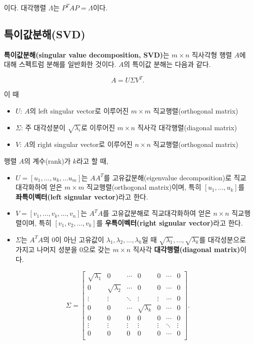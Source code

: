 \documentclass[b5paper,]{scrbook}
\theoremstyle{plain}
\theoremstyle{definition}
\numberwithin{equation}{section}
\begin{document}
이다. 대각행렬 \(\Lambda\)는 \(P^{T}AP=\Lambda\)이다.

\subsection{특이값분해(SVD)}\label{svd}

\textbf{특이값분해(singular value decomposition, SVD)}는 \(m\times n\)
직사각형 행렬 \(A\)에 대해 스펙트럼 분해를 일반화한 것이다. \(A\)의
특이값 분해는 다음과 같다.

\[A=U\Sigma V^{T}.\]

이 때

\begin{itemize}
\item
  \(U\): \(A\)의 left singular vector로 이루어진 \(m\times m\)
  직교행렬(orthogonal matrix)
\item
  \(\Sigma\): 주 대각성분이 \(\sqrt{\lambda_{i}}\)로 이루어진
  \(m\times n\) 직사각 대각행렬(diagonal matrix)
\item
  \(V\): \(A\)의 right singular vector로 이루어진 \(n\times n\)
  직교행렬(orthogonal matrix)
\end{itemize}

행렬 \(A\)의 계수(rank)가 \(k\)라고 할 때,

\begin{itemize}
\item
  \(U=[u_{1},\ldots , u_{k}, \ldots u_{m}]\)는 \(AA^{T}\)를
  고유값분해(eigenvalue decomposition)로 직교대각화하여 얻은
  \(m\times m\) 직교행렬(orthogonal matrix)이며, 특히
  \([u_{1},\ldots, u_{k}]\)를 \textbf{좌특이벡터(left signular
  vector)}라고 한다.
\item
  \(V=[v_{1},\ldots ,v_{k},\ldots , v_{n}]\)는 \(A^{T}A\)를 고유값분해로
  직교대각화하여 얻은 \(n\times n\) 직교행렬이며, 특히
  \([v_{1},v_{2},\ldots ,v_{k}]\)를 \textbf{우특이벡터(right signular
  vector)}라고 한다.
\item
  \(\Sigma\)는 \(A^{T}A\)의 0이 아닌 고유값이
  \(\lambda_{1},\lambda_{2},\ldots , \lambda_{k}\)일 때
  \(\sqrt{\lambda_{1}},\ldots, \sqrt{\lambda_{k}}\)를 대각성분으로
  가지고 나머지 성분을 0으로 갖는 \(m\times n\) 직사각
  \textbf{대각행렬(diagonal matrix)}이다.
\end{itemize}

\[
\Sigma=
\begin{bmatrix}
\sqrt{\lambda_{1}} & 0 & \cdots & 0 & 0 & \cdots & 0\\
0 & \sqrt{\lambda_{2}} & \cdots & 0 & 0 & \cdots & 0\\
\vdots & \vdots & \ddots & \vdots & \vdots & \cdots & 0\\
0 & 0 & \cdots & \sqrt{\lambda_{k}} & 0 & \cdots & 0\\
0 & 0 & 0 & 0 & 0 & \cdots & 0\\
\vdots & \vdots & \vdots & \vdots & \vdots & \ddots & \vdots\\
0 & 0 & 0 & 0 & 0 & \cdots & 0\\
\end{bmatrix}.
\]
\end{document}
